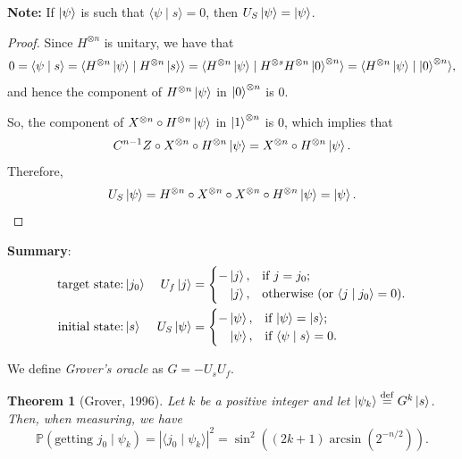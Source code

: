 \documentclass[12pt]{amsart}
\theoremstyle{plain}
\newtheorem{theorem}{Theorem}[section]
\theoremstyle{definition}
\theoremstyle{remark}
\newcommand{\idef}{\overset{{\rm def}}{=}}
\newcommand{\abs}[1]{\left| #1 \right|}
\newcommand{\prob}{\mathbb{P}}
\begin{document}
\textbf{Note:} If $\ket{\psi}$ is such that $\langle \psi \mid s  \rangle = 0$, then $U_S \ket{\psi} = \ket{\psi}$.

\begin{proof}
  Since $H^{\otimes n}$ is unitary, we have that
  \[
    0 = \langle \psi \mid s  \rangle = \langle H^{\otimes n} \ket{\psi} \mid  H^{\otimes n} \ket{s} \rangle = \langle H^{\otimes n} \ket{\psi} \mid H^{\otimes s} H^{\otimes n} \ket{0}^{\otimes n} \rangle = \langle H^{\otimes n }\ket{\psi} \mid \ket{0}^{\otimes n} \rangle,
  \]
  and hence the component of $H^{\otimes n} \ket{\psi}$ in $\ket{0}^{\otimes n}$ is $0$.

  So, the component of $X^{\otimes n} \circ H^{\otimes n} \ket{\psi}$ in $\ket{1}^{\otimes n}$ is $0$, which implies that
  \[
    C^{n-1}Z \circ X^{\otimes n} \circ H^{\otimes n} \ket{\psi} =  X^{\otimes n} \circ H^{\otimes n} \ket{\psi}.
  \]
  Therefore,
  \[
    U_S \ket{\psi} = H^{\otimes n} \circ X^{\otimes n} \circ X^{\otimes n} \circ H^{\otimes n} \ket{\psi} = \ket{\psi}.
  \]
\end{proof}


\textbf{Summary}:
\begin{align*}
  \text{target state:}& \ket{j_0} & U_f \ket{j} &=
                              \begin{cases}
                                - \ket{j},& \text{if $j = j_0$;} \\
                                \phantom{-} \ket{j},& \text{otherwise (or $\langle j \mid j_0  \rangle = 0$)}.
                              \end{cases} \\
  \text{initial state:}& \ket{s} & U_S \ket{\psi} &=
                              \begin{cases}
                                - \ket{\psi},& \text{if $\ket{\psi} = \ket{s}$;} \\
                                \phantom{-} \ket{\psi},& \text{if $\langle \psi \mid s \rangle = 0$}.
                              \end{cases} \\
\end{align*}

We define \emph{Grover's oracle} as $G = - U_s U_f$.
\begin{theorem}[Grover, 1996]
  Let $k$ be a positive integer and let $\ket{\psi_k} \idef G^k \ket{s}$.  Then, when measuring, we have
  \[
    \prob(\text{getting $j_0$} \mid \psi_k) = \abs{\langle j_0 \mid \psi_k \rangle}^2 = \sin^2 \left( (2k+1) \arcsin \left( 2^{-n/2} \right) \right).
  \]
\end{theorem}
\end{document}
